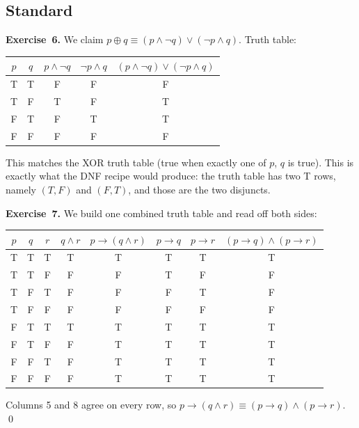 \documentclass[11pt]{article}
\begin{document}
\subsection*{Standard}

\textbf{Exercise~6.}
We claim $p \oplus q \equiv (p \wedge \lnot q) \vee (\lnot p \wedge q)$.
Truth table:

\begin{center}
\begin{tabular}{cc|c|c|c}
\toprule
$p$ & $q$ & $p \wedge \lnot q$ & $\lnot p \wedge q$
    & $(p \wedge \lnot q) \vee (\lnot p \wedge q)$ \\
\midrule
T & T & F & F & F \\
T & F & T & F & T \\
F & T & F & T & T \\
F & F & F & F & F \\
\bottomrule
\end{tabular}
\end{center}

This matches the XOR truth table (true when exactly one of $p$, $q$ is true). This is exactly what the DNF recipe would produce: the truth table has two T rows, namely $(T,F)$ and $(F,T)$, and those are the two disjuncts.

\medskip
\textbf{Exercise~7.}
We build one combined truth table and read off both sides:
\begin{center}
\begin{tabular}{ccc|c|c|c|c|c}
\toprule
$p$ & $q$ & $r$ & $q \wedge r$ & $p \to (q \wedge r)$ & $p \to q$ & $p \to r$ & $(p\to q) \wedge (p\to r)$ \\
\midrule
T & T & T & T & T & T & T & T \\
T & T & F & F & F & T & F & F \\
T & F & T & F & F & F & T & F \\
T & F & F & F & F & F & F & F \\
F & T & T & T & T & T & T & T \\
F & T & F & F & T & T & T & T \\
F & F & T & F & T & T & T & T \\
F & F & F & F & T & T & T & T \\
\bottomrule
\end{tabular}
\end{center}
Columns 5 and 8 agree on every row, so $p \to (q \wedge r) \equiv (p \to q) \wedge (p \to r)$. \qed
\end{document}
